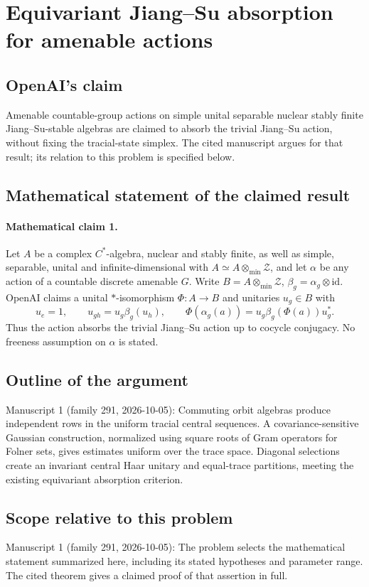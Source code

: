 \documentclass[11pt]{article}
\begin{document}
\section*{Equivariant Jiang–Su absorption for amenable actions}

\subsection{OpenAI's claim}
Amenable countable-group actions on simple unital separable nuclear stably finite Jiang--Su-stable algebras are claimed to absorb the trivial Jiang--Su action, without fixing the tracial-state simplex. The cited manuscript argues for that result; its relation to this problem is specified below.

\subsection{Mathematical statement of the claimed result}
\paragraph{Mathematical claim 1.} Let $A$ be a complex $C^*$-algebra, nuclear and stably finite, as well as simple, separable, unital and infinite-dimensional with $A\simeq A\otimes_{\min}\mathcal Z$, and let $\alpha$ be any action of a countable discrete amenable $G$. Write $B=A\otimes_{\min}\mathcal Z$, $\beta_g=\alpha_g\otimes\mathrm{id}$. OpenAI claims a unital $*$-isomorphism $\Phi:A\to B$ and unitaries $u_g\in B$ with
\[
u_e=1,\qquad u_{gh}=u_g\beta_g(u_h),\qquad
\Phi(\alpha_g(a))=u_g\beta_g(\Phi(a))u_g^*.
\]
Thus the action absorbs the trivial Jiang--Su action up to cocycle conjugacy. No freeness assumption on $\alpha$ is stated.

\subsection{Outline of the argument}
Manuscript 1 (family 291, 2026-10-05): Commuting orbit algebras produce independent rows in the uniform tracial central sequences. A covariance-sensitive Gaussian construction, normalized using square roots of Gram operators for Folner sets, gives estimates uniform over the trace space. Diagonal selections create an invariant central Haar unitary and equal-trace partitions, meeting the existing equivariant absorption criterion.

\subsection{Scope relative to this problem}
Manuscript 1 (family 291, 2026-10-05): The problem selects the mathematical statement summarized here, including its stated hypotheses and parameter range. The cited theorem gives a claimed proof of that assertion in full.
\end{document}
